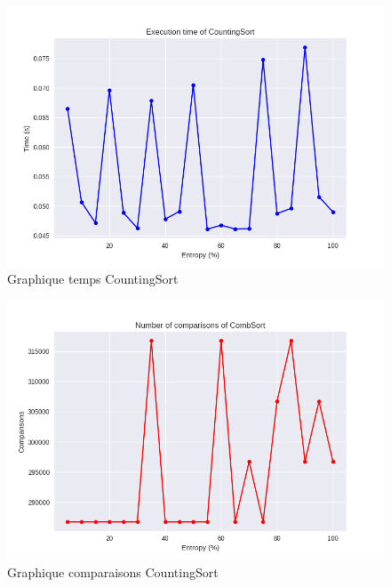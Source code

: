 \documentclass[10pt,a4paper]{article}
\begin{document}
            \begin{figure}
                \centering
                \includegraphics[width=1\textwidth]{graphique/CountingSort/GraphTimeCountingSort.png}
                \caption{Graphique temps CountingSort}
                \label{fig:mesh1}
            \end{figure}
            \begin{figure}
                \centering
                \includegraphics[width=1\textwidth]{graphique/CombSort/GraphComparisonsCombSort.png}
                \caption{Graphique comparaisons CountingSort}
                \label{fig:mesh1}
            \end{figure}
\end{document}
